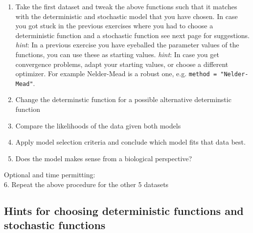 \documentclass[]{article}
\providecommand{\tightlist}{%
  \setlength{\itemsep}{0pt}\setlength{\parskip}{0pt}}
\begin{document}
\begin{enumerate}
\def\labelenumi{\arabic{enumi}.}
\tightlist
\item
  Take the first dataset and tweak the above functions such that it
  matches with the deterministic and stochastic model that you have
  chosen. In case you got stuck in the previous exercises where you had
  to choose a deterministic function and a stochastic function see next
  page for suggestions. \emph{hint}: In a previous exercise you have
  eyeballed the parameter values of the functions, you can use these as
  starting values. \emph{hint}: In case you get convergence problems,
  adapt your starting values, or choose a different optimizer. For
  example Nelder-Mead is a robust one, e.g.
  \texttt{method\ =\ "Nelder-Mead"}.
\item
  Change the determinstic function for a possible alternative
  determinstic function
\item
  Compare the likelihoods of the data given both models
\item
  Apply model selection criteria and conclude which model fits that data
  best.
\item
  Does the model makes sense from a biological perspective?
\end{enumerate}

Optional and time permitting:\\
6. Repeat the above procedure for the other 5 datasets

\newpage

\subsection{Hints for choosing deterministic functions and stochastic
functions}\label{hints-for-choosing-deterministic-functions-and-stochastic-functions}
\end{document}
